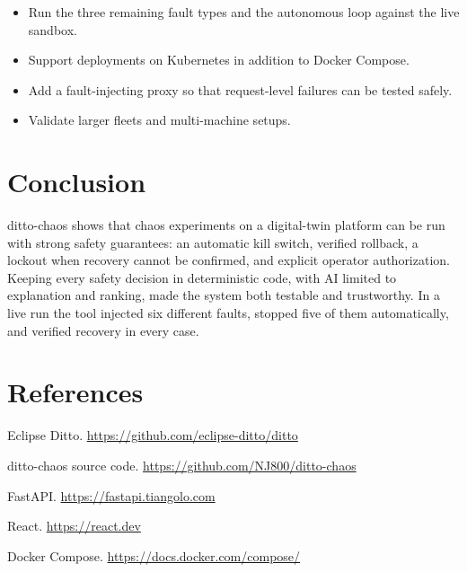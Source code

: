 \documentclass[11pt,a4paper]{article}
\begin{document}
\begin{itemize}
  \item Run the three remaining fault types and the autonomous loop against
        the live sandbox.
  \item Support deployments on Kubernetes in addition to Docker Compose.
  \item Add a fault-injecting proxy so that request-level failures can be
        tested safely.
  \item Validate larger fleets and multi-machine setups.
\end{itemize}

\section{Conclusion}

ditto-chaos shows that chaos experiments on a digital-twin platform can be run
with strong safety guarantees: an automatic kill switch, verified rollback, a
lockout when recovery cannot be confirmed, and explicit operator
authorization. Keeping every safety decision in deterministic code, with AI
limited to explanation and ranking, made the system both testable and
trustworthy. In a live run the tool injected six different faults, stopped
five of them automatically, and verified recovery in every case.

\section*{References}

\begin{enumerate}[label={[\arabic*]}]
  \item Eclipse Ditto. \url{https://github.com/eclipse-ditto/ditto}
  \item ditto-chaos source code. \url{https://github.com/NJ800/ditto-chaos}
  \item FastAPI. \url{https://fastapi.tiangolo.com}
  \item React. \url{https://react.dev}
  \item Docker Compose. \url{https://docs.docker.com/compose/}
\end{enumerate}
\end{document}
